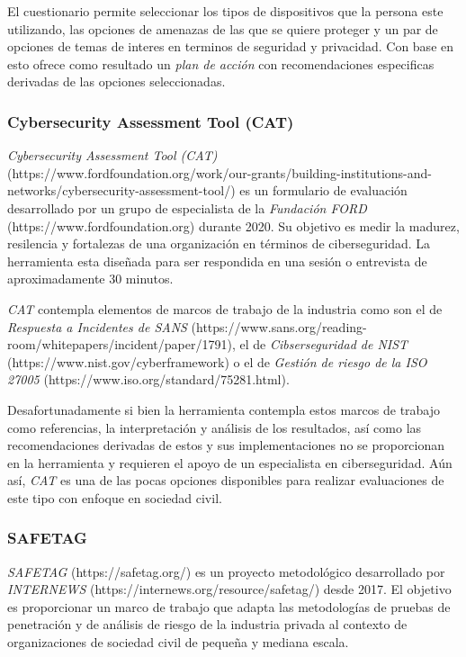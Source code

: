 \documentclass[12pt]{caltech_thesis}
\begin{document}
El cuestionario permite seleccionar los tipos de dispositivos que la persona este utilizando, las opciones de amenazas de las que se quiere proteger y un par de opciones de temas de interes en terminos de seguridad y privacidad. Con base en esto ofrece como resultado un \textit{plan de acción} con recomendaciones especificas derivadas de las opciones seleccionadas.

\subsubsection{Cybersecurity Assessment Tool (CAT)}

\textit{Cybersecurity Assessment Tool (CAT)} (https://www.fordfoundation.org/work/our-grants/building-institutions-and-networks/cybersecurity-assessment-tool/) es un formulario de evaluación desarrollado por un grupo de especialista de la \textit{Fundación FORD} (https://www.fordfoundation.org) durante 2020. Su objetivo es medir la madurez, resilencia y fortalezas de una organización en términos de ciberseguridad. La herramienta esta diseñada para ser respondida en una sesión o entrevista de aproximadamente 30 minutos.

\textit{CAT} contempla elementos de marcos de trabajo de la industria como son el de \textit{Respuesta a Incidentes de SANS} (https://www.sans.org/reading-room/whitepapers/incident/paper/1791), el de \textit{Cibserseguridad de NIST} (https://www.nist.gov/cyberframework) o el de \textit{Gestión de riesgo de la ISO 27005} (https://www.iso.org/standard/75281.html).

Desafortunadamente si bien la herramienta contempla estos marcos de trabajo como referencias, la interpretación y análisis de los resultados, así como las recomendaciones derivadas de estos y sus implementaciones no se proporcionan en la herramienta y requieren el apoyo de un especialista en ciberseguridad. Aún así, \textit{CAT} es una de las pocas opciones disponibles para realizar evaluaciones de este tipo con enfoque en sociedad civil.

\subsubsection{SAFETAG}

\textit{SAFETAG} (https://safetag.org/) es un proyecto metodológico desarrollado por \textit{INTERNEWS} (https://internews.org/resource/safetag/) desde 2017. El objetivo es proporcionar un marco de trabajo que adapta las metodologías de pruebas de penetración y de análisis de riesgo de la industria privada al contexto de organizaciones de sociedad civil de pequeña y mediana escala. 
\end{document}
